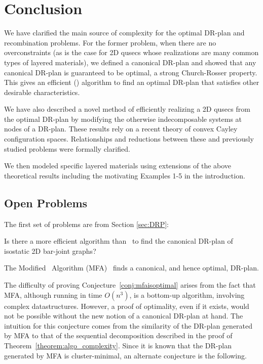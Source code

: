 \section{Conclusion}
\label{sec:conclusion}

We have clarified the main source of complexity for the optimal DR-plan and recombination problems. For the former problem, when there are no overconstraints (as is the case for 2D qusecs whose realizations are many common types of layered materials), we defined a canonical DR-plan and showed that any canonical DR-plan is guaranteed to be optimal, a strong Church-Rosser property. This gives an efficient (\candrpcomplexity) algorithm to find an optimal DR-plan that satisfies other desirable characteristics.

We have also described a novel method of efficiently realizing a 2D qusecs from the optimal DR-plan by modifying the otherwise indecomposable systems  at nodes of a DR-plan. These results rely on a recent theory of convex Cayley configuration spaces. Relationships and reductions between these and previously studied problems were formally clarified.

We then modeled specific layered materials using extensions of the above theoretical results including the motivating Examples 1-5 in the introduction.


\subsection{Open Problems}
\label{sec:appendix:b}
\label{sec:futurework}
\label{sec:open}

The first set of problems are from Section \ref{sec:DRP}:
\begin{openproblem}
    Is there a more efficient algorithm than \candrpcomplexityv\ to find the canonical DR-plan of isostatic 2D bar-joint graphs?
\end{openproblem}

\begin{conjecture}
\label{conj:mfaisoptimal}
    The Modified \frontier\ Algorithm (MFA)~\cite{lomonosov2004graph} finds a canonical, and hence optimal, DR-plan.
\end{conjecture}

The difficulty of proving Conjecture~\ref{conj:mfaisoptimal} arises from the fact that MFA, although running in time $O(n^3)$, is a bottom-up algorithm, involving complex datastructures. However, a proof of optimality, even if it exists, would not be possible without the new notion of a canonical DR-plan at hand. The intuition for this conjecture comes from the similarity of the DR-plan generated by MFA to that of the sequential decomposition described in the proof of Theorem~\ref{theorem:algo_complexity}.  Since it is known \cite{lomonosov2004graph} that the DR-plan generated by MFA is cluster-minimal, an alternate conjecture is the following.


